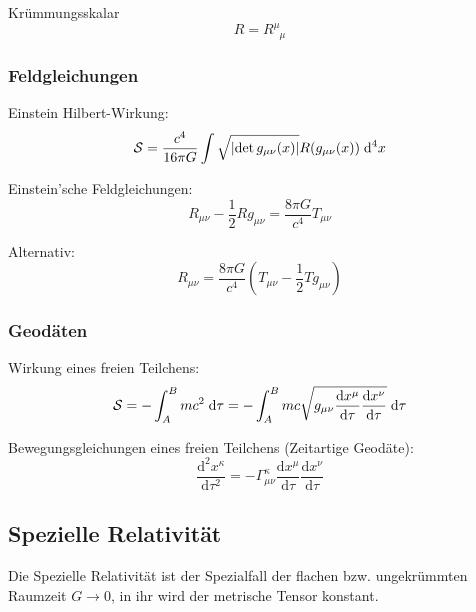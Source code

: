 			\noindent
			Krümmungsskalar
			\begin{equation}
				R = R^\mu_{\phantom{\mu}\mu}
			\end{equation}

		\subsubsection{Feldgleichungen}
			\noindent
			Einstein Hilbert-Wirkung:
			\begin{equation}
				\mathcal{S} = \frac{c^4}{16\pi G} \int \sqrt{\left|\det{g_{\mu\nu}(x)}\right|} R(g_{\mu\nu}(x))\;\mathrm{d}^4 x
			\end{equation}

			\noindent
			Einstein'sche Feldgleichungen:
			\begin{equation}
				R_{\mu\nu} - \frac{1}{2} R g_{\mu\nu} = \frac{8\pi G}{c^4} T_{\mu\nu}
			\end{equation}

			\noindent
			Alternativ:
			\begin{equation}
				R_{\mu\nu} = \frac{8\pi G}{c^4} \left( T_{\mu\nu} - \frac{1}{2} T g_{\mu\nu} \right)
			\end{equation}


		\subsubsection{Geodäten}
			\noindent
			Wirkung eines freien Teilchens:
			\begin{equation}
				\mathcal{S} = -\int_A^B mc^2\;\mathrm{d} \tau = -\int_A^B mc\sqrt{g_{\mu\nu} \frac{\mathrm{d} x^\mu}{\mathrm{d} \tau} \frac{\mathrm{d} x^\nu}{\mathrm{d} \tau}} \;\mathrm{d} \tau
			\end{equation}

			\noindent
			Bewegungsgleichungen eines freien Teilchens (Zeitartige Geodäte):
			\begin{equation}
				\frac{\mathrm{d}^2 x^\kappa}{\mathrm{d}\tau^2}=-\Gamma_{\mu\nu}^{\kappa}\frac{\mathrm{d}x^\mu}{\mathrm{d}\tau}\frac{\mathrm{d}x^\nu}{\mathrm{d}\tau}
			\end{equation}

	\subsection{Spezielle Relativität}
		\noindent
		Die Spezielle Relativität ist der Spezialfall der flachen bzw. ungekrümmten Raumzeit $G\rightarrow 0$, in ihr wird der metrische Tensor konstant.

